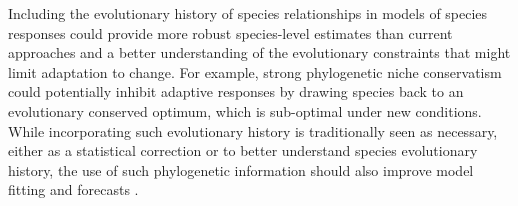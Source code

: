 \documentclass[11pt]{article}
\begin{document}
Including the evolutionary history of species relationships in models of species responses could provide more robust species-level estimates than current approaches and a better understanding of the evolutionary constraints that might limit adaptation to change. For example, strong phylogenetic niche conservatism \citep{wiens2010niche} could potentially inhibit adaptive responses by drawing species back to an evolutionary conserved optimum, which is sub-optimal under new conditions. %
While incorporating such evolutionary history is traditionally seen as necessary, either as a statistical correction or to better understand species evolutionary history, the use of such phylogenetic information should also improve model fitting and forecasts \citep{freckleton2002phylogenetic}.



 
\end{document}
